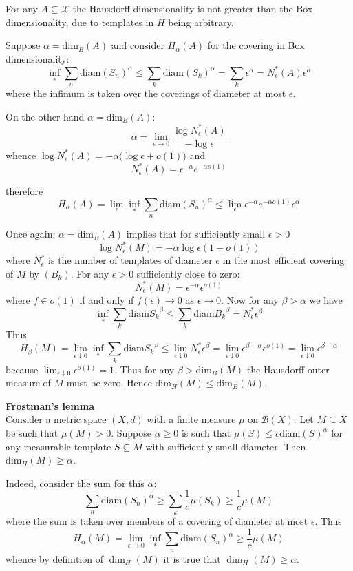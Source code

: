 \documentclass[a4paper]{article}
\newcommand{\Xcal}{\mathcal{X}}
\begin{document}
For any $A\subseteq \Xcal$ the Hausdorff dimensionality is not greater than the Box dimensionality, due to templates in $H$ being arbitrary.

Suppose $\alpha = \text{dim}_B(A)$ and consider $H_\alpha(A)$ for the covering in Box dimensionality:
\[\inf_{*} \sum_n \text{diam}(S_n)^\alpha \leq \sum_k \text{diam}(S_k)^\alpha = \sum_k \epsilon^\alpha = N^*_\epsilon(A) \epsilon^\alpha\]
where the infimum is taken over the coverings of diameter at most $\epsilon$.

On the other hand $\alpha = \text{dim}_B(A)$:
\[\alpha = \lim_{\epsilon\to 0}\frac{\log N^*_\epsilon(A)}{-\log \epsilon}\]
whence $\log N^*_\epsilon(A) = -\alpha \big(\log \epsilon + o(1)\big)$ and
\[N^*_\epsilon(A) = \epsilon^{-\alpha}e^{-\alpha o(1)}\]

therefore
\[H_\alpha(A) = \lim_{\epsilon} \inf_{*} \sum_n \text{diam}(S_n)^\alpha \leq \lim_{\epsilon} \epsilon^{-\alpha}e^{-\alpha o(1)} \epsilon^\alpha \]

Once again: $\alpha = \text{dim}_B(A)$ implies that for sufficiently small $\epsilon>0$
\[\log N_\epsilon^*(M) = -\alpha \log \epsilon (1 - o(1)) \]
where $N_\epsilon^*$ is the number of templates of diameter $\epsilon$ in the most
efficient covering of $M$ by $(B_k)$. For any $\epsilon>0$ sufficiently close
to zero:
\[ N_\epsilon^*(M) = \epsilon^{-\alpha} \epsilon^{o(1)}\]
where $f\in o(1)$ if and only if $f(\epsilon)\to 0$ as $\epsilon\to0$.
Now for any $\beta>\alpha$ we have
\[
\inf_* \sum_k\text{diam}{S_k}^\beta
\leq \sum_k\text{diam}{B_k}^\beta
= N_\epsilon^* \epsilon^\beta
\]
Thus
\[
H_\beta(M)
= \lim_{\epsilon\downarrow0} \inf_* \sum_k\text{diam}{S_k}^\beta
\leq \lim_{\epsilon\downarrow0} N_\epsilon^* \epsilon^\beta
= \lim_{\epsilon\downarrow0} \epsilon^{\beta-\alpha} \epsilon^{o(1)}
= \lim_{\epsilon\downarrow0} \epsilon^{\beta-\alpha}
\]
because $\lim_{\epsilon\downarrow0} \epsilon^{o(1)} = 1$.
Thus for any $\beta > \text{dim}_B(M)$ the Hausdorff outer measure of $M$ must be
zero. Hence $\text{dim}_H(M)\leq \text{dim}_B(M)$.


\noindent\textbf{Frostman's lemma}\hfill\\
Consider a metric space $(X,d)$ with a finite measure $\mu$ on $\mathcal{B}(X)$. Let $M\subseteq X$ be such that $\mu(M) > 0$. Suppose $\alpha\geq 0$ is such that $\mu(S) \leq c \text{diam}(S)^\alpha$ for any measurable template $S\subseteq M$ with sufficiently small diameter. Then $\text{dim}_H(M) \geq \alpha$.

Indeed, consider the sum for this $\alpha$:
\[\sum_n \text{diam}(S_n)^\alpha \geq \sum_k \frac{1}{c} \mu(S_k) \geq \frac{1}{c} \mu(M)\]
where the sum is taken over members of a covering of diameter at most $\epsilon$. Thus
\[H_\alpha(M) = \lim_{\epsilon\to 0}\inf_* \sum_n \text{diam}(S_n)^\alpha \geq \frac{1}{c} \mu(M)\]
whence by definition of $\dim_H(M)$ it is true that $\dim_H(M) \geq \alpha$.
\end{document}
